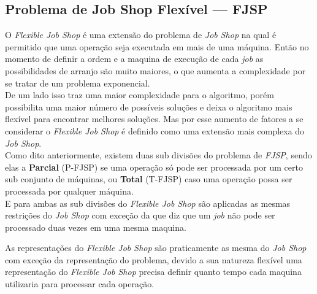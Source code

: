 


    \subsection{Problema de Job Shop Flexível — FJSP}
            O \textit{Flexible Job Shop} é uma extensão do problema de \textit{Job Shop} na qual é permitido que uma operação seja executada em mais de uma máquina. Então no momento de definir a ordem e a maquina de execução de cada \textit{job} as possibilidades de arranjo são muito maiores, o que aumenta a complexidade por se tratar de um problema exponencial.\\
            
            De um lado isso traz uma maior complexidade para o algoritmo, porém possibilita uma maior número de possíveis soluções e deixa o algoritmo mais flexível para encontrar melhores soluções. Mas por esse aumento de fatores a se considerar o \textit{Flexible Job Shop} é definido como uma extensão mais complexa do \textit{Job Shop}.\\

            Como dito anteriormente, existem duas sub divisões do problema de \textit{FJSP}, sendo elas a \textbf{Parcial} (P-FJSP) se uma operação só pode ser processada por um certo sub conjunto de máquinas, ou \textbf{Total} (T-FJSP) caso uma operação possa ser processada por qualquer máquina.\\

            E para ambas as sub divisões do \textit{Flexible Job Shop} são aplicadas as mesmas restrições do \textit{Job Shop} com exceção da que diz que um \textit{job} não pode ser processado duas vezes em uma mesma maquina.\hfill

            As representações do \textit{Flexible Job Shop} são praticamente as mesma do \textit{Job Shop} com exceção da representação do problema, devido a sua natureza flexível uma representação do \textit{Flexible Job Shop} precisa definir quanto tempo cada maquina utilizaria para processar cada operação.\\
            
